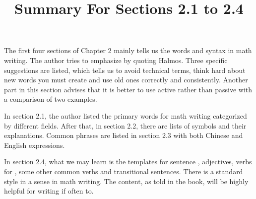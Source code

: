 \title{Summary For Sections 2.1 to 2.4}
\author{}
\date{}

\maketitle



The first four sections of Chapter 2 mainly tells us the words and syntax in math writing. The author tries to emphasize  by quoting Halmos. Three specific suggestions are listed, which tells us to avoid technical terms, think hard about new words you must create and use old ones correctly and consistently. Another part in this section advises that it is better to use active rather than passive  with a comparison of two examples.

In section 2.1, the author listed the primary words for math writing categorized by different fields. After that, in section 2.2, there are  lists of symbols and their explanations. Common phrases are listed in section 2.3 with both Chinese and English expressions.

In section 2.4, what we may learn is the templates for sentence , adjectives, verbs for , some other common verbs and transitional sentences. There is a standard style in a sense in math writing. The content, as told in the book, will be highly helpful for writing if often  to.

